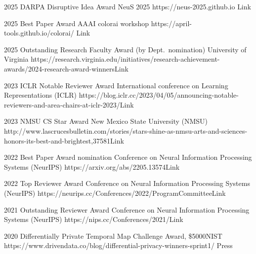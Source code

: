 \documentclass[localFont,alternative]{documentMETADATA}
\begin{document}

\begin{awards}
	\awardentry
	{2025}
	{DARPA Disruptive Idea Award}%
	{NeuS 2025}
	{https://neus-2025.github.io}
	{Link}

	\awardentry
	{2025}
	{Best Paper Award}
	{AAAI colorai workshop}
	{https://april-tools.github.io/colorai/}
	{Link}

	\awardentry
	{2025}
	{Outstanding Research Faculty Award (by Dept.~nomination)}
	{University of Virginia}%
	{https://research.virginia.edu/initiatives/research-achievement-awards/2024-research-award-winners}{Link}

	\awardentry
	{2023}
	{ICLR Notable Reviewer Award}%
	{International conference on Learning Representations (ICLR)} 
	{https://blog.iclr.cc/2023/04/05/announcing-notable-reviewers-and-area-chairs-at-iclr-2023/}{Link}

	\awardentry
	{2023}
	{NMSU CS Star Award}%
	{New Mexico State University (NMSU)} 
	{http://www.lascrucesbulletin.com/stories/stars-shine-as-nmsu-arts-and-sciences-honors-its-best-and-brightest,37581}{Link}

	\awardentry
	{2022}
	{Best Paper Award nomination}%
	{Conference on Neural Information Processing Systems (NeurIPS)} 
	{https://arxiv.org/abs/2205.13574}{Link}

	\awardentry
	{2022}
	{Top Reviewer Award}%
	{Conference on Neural Information Processing Systems (NeurIPS)} 
	{https://neurips.cc/Conferences/2022/ProgramCommittee}{Link}

	\awardentry
	{2021}
	{Outstanding Reviewer Award}%
	{Conference on Neural Information Processing Systems (NeurIPS)} 
	{https://nips.cc/Conferences/2021/}{Link}

	\awardentry
	{2020}
	{Differentially Private Temporal Map Challenge Award, \$5000}{NIST}
	{https://www.drivendata.co/blog/differential-privacy-winners-sprint1/}
	{Press}


\end{awards}
\end{document}
